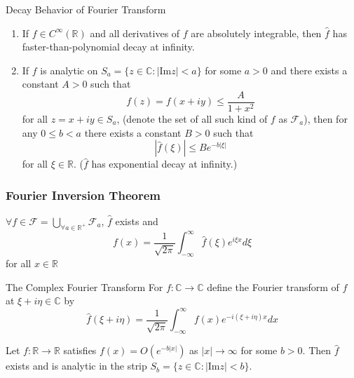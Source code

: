 \documentclass{beamer}
\begin{document}
\begin{frame}
\begin{block}{Decay Behavior of Fourier Transform}
\begin{enumerate}
\item If $f \in C^{\infty}(\mathbb{R})$ and all derivatives of $f$ are absolutely integrable, then $\widehat{f}$ has faster-than-polynomial decay at infinity.
\item If $f$ is analytic on $S_a=\lbrace z \in \mathbb{C}: |\text{Im} z| < a\rbrace$ for some $a>0$ and there exists a constant $A>0$ such that
$$f(z)=f(x+iy)\leqslant\dfrac{A}{1+x^2}$$
for all $z=x+iy\in S_a$, (denote the set of all such kind of $f$ as $\mathscr{F}_a$), then for any $0 \leqslant b < a$ there exists a constant $B > 0$ such that 
$$|\widehat{f}(\xi)|\leqslant Be^{-b|\xi|}$$
 for all $ \xi\in\mathbb{R} $. ($\widehat{f}$ has exponential decay at infinity.)
\end{enumerate}

\end{block}
\end{frame}


\begin{frame}
\frametitle{Fourier Inversion Theorem}
$\forall f\in\mathscr{F}=\bigcup\limits_{\forall a\in\mathbb{R}^+}\mathscr{F}_a$, $\widehat{f}$ exists and
$$f(x)=\dfrac{1}{\sqrt{2\pi}}\int_{-\infty}^{\infty}\widehat{f}(\xi)e^{i\xi x}d\xi$$
for all $x\in\mathbb{R}$

\end{frame}

\begin{frame}
\begin{block}{The Complex Fourier Transform}
For $f : \mathbb{C}\rightarrow \mathbb{C}$ define the Fourier transform of $f$ at $\xi + i\eta\in \mathbb{C}$ by 
$$\widehat{f}(\xi+i\eta)=\dfrac{1}{\sqrt{2\pi}}\int_{-\infty}^{\infty}f(x)e^{-i(\xi+i\eta) x}dx$$
\end{block}
\begin{block}{}
Let $f :\mathbb{R}\rightarrow \mathbb{R}$ satisfies $f (x) = O(e^{-b|x|})$ as $|x| \rightarrow \infty$ for some $b > 0$. Then $\widehat{f}$ exists and is analytic in the strip $S_b = \lbrace z \in\mathbb{C}:|\text{Im} z| < b\rbrace$.
\end{block}

\end{frame}
\end{document}
